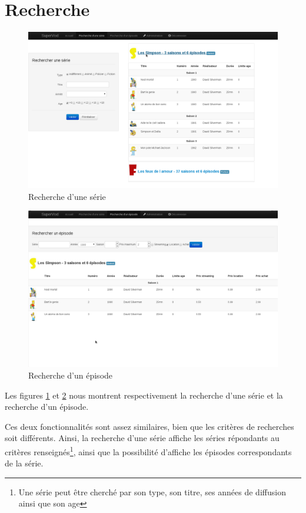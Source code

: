 \documentclass[12pt,a4paper,openany]{book}
\begin{document}
	\section{Recherche}
	\begin{figure}[H]
		\centering
		\includegraphics[width=15.7cm]{screens/rechercheSerie.png}
		\caption{Recherche d'une série}
		\label{fig:rechercheSerie}
	\end{figure}
	\begin{figure}[H]
		\centering
		\includegraphics[width=15.7cm]{screens/rechercheEpisodes.png}
		\caption{Recherche d'un épisode}
		\label{fig:rechercheEpisode}
	\end{figure}
	Les figures \ref{fig:rechercheSerie} et \ref{fig:rechercheEpisode} nous montrent respectivement la recherche d'une série et la recherche d'un épisode.

	Ces deux fonctionnalités sont assez similaires, bien que les critères de recherches soit différents. Ainsi, la recherche d'une série affiche les séries
	répondants au critères renseignés\footnote{Une série peut être cherché par son type, son titre, ses années de diffusion ainsi que son age}, ainsi que la
	possibilité d'affiche les épisodes correspondants de la série.
\end{document}
